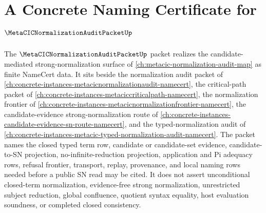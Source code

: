 \chapter{A Concrete Naming Certificate for $\MetaCICNormalizationAuditPacketUp$}
\label{ch:concrete-instances-metacic-normalization-audit-packet-namecert}

The $\MetaCICNormalizationAuditPacketUp$ packet realizes the candidate-mediated strong-normalization surface of \autoref{ch:metacic-normalization-audit-map} as finite NameCert data. It sits beside the normalization audit packet of \autoref{ch:concrete-instances-metacicnormalizationaudit-namecert}, the critical-path packet of \autoref{ch:concrete-instances-metaciccriticalpath-namecert}, the normalization frontier of \autoref{ch:concrete-instances-metacicnormalizationfrontier-namecert}, the candidate-evidence strong-normalization route of \autoref{ch:concrete-instances-candidate-evidence-sn-route-namecert}, and the typed-normalization audit of \autoref{ch:concrete-instances-metacic-typed-normalization-audit-namecert}. The packet names the closed typed term row, candidate or candidate-set evidence, candidate-to-SN projection, no-infinite-reduction projection, application and Pi adequacy rows, refusal frontier, transport, replay, provenance, and local naming rows needed before a public SN read may be cited. It does not assert unconditional closed-term normalization, evidence-free strong normalization, unrestricted subject reduction, global confluence, quotient syntax equality, host evaluation soundness, or completed closed consistency.

